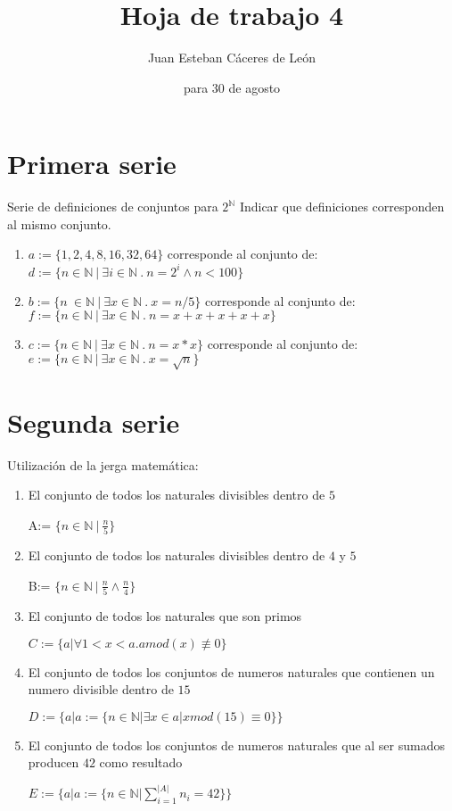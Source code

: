 \documentclass{article}
\title{Hoja de trabajo 4}
\author{Juan Esteban Cáceres de León}
\date{para 30 de agosto}
\begin{document}
\maketitle

\section{Primera serie}
Serie de definiciones de conjuntos para $2^{\mathbb{N}}$ Indicar que definiciones corresponden al mismo conjunto.

\begin{enumerate}
    \item {$a:=\{1,2,4,8,16,32,64\}$} corresponde al conjunto de: {$d:=\{n\in\mathbb{N}\ |\ \exists i\in\mathbb{N}\ .\ n=2^i\wedge n<100 \}$}
    \item {$b:=\{n\ \in \mathbb{N}\ |\ \exists x \in \mathbb{N}\ .\ x=n/5 \}$} corresponde al conjunto de: {$f:=\{ n\in\mathbb{N}\ |\ \exists x\in \mathbb{N}\ .\ n=x+x+x+x+x \}$}
    \item {$c:=\{n\in \mathbb{N}\ |\ \exists x\in\mathbb{N}\ .\ n=x*x \}$} corresponde al conjunto de: {$e:=\{ n\in\mathbb{N}\ |\ \exists x\in \mathbb{N}\ .\ x=\sqrt{n} \}$}
\end{enumerate}
\section{Segunda serie}
Utilización de la jerga matemática:
\begin{enumerate}
    \item {El conjunto de todos los naturales divisibles dentro de $5$}
    \begin{center}
       A:= {$\{n\in \mathbb{N}\ |\ \frac{n}{5}\}$}
    \end{center}
    \item {El conjunto de todos los naturales divisibles dentro de $4$ y $5$}
    \begin{center}
       B:=  {$\{n\in \mathbb{N}\ |\ \frac{n}{5} \wedge \frac{n}{4}\}$}
    \end{center}
\item{El conjunto de todos los naturales que son primos}
\begin{center}
    $C:= \{ a|\forall 1<x<a. a mod(x)\not\equiv 0 \}$
\end{center}
\item {El conjunto de todos los conjuntos de numeros naturales que contienen
        un numero divisible dentro de $15$}
        \begin{center}
            $D:= \{a|a := \{ n\in \mathbb{N} | \exists x \in a| xmod(15)\equiv 0\} \}$
        \end{center}
    \item {El conjunto de todos los conjuntos de numeros naturales que al ser sumados
        producen $42$ como resultado}
        \begin{center}
            $E:= \{ a|a:= \{ n\in \mathbb{N} | \sum_{i=1}^{|A|} n_i = 42 \} \}$
        \end{center}
\end{enumerate}
\end{document}
